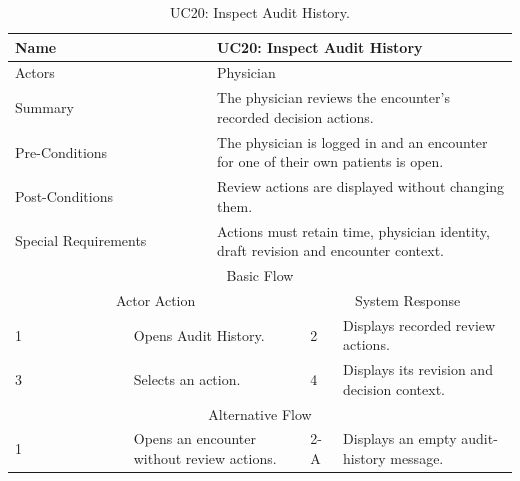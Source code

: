 \begin{table}[htbp]
\centering
\small
\caption{UC20: Inspect Audit History.}
\label{tab:kashaf:uc20}
\begin{tabular}{|p{}|p{}|p{}|p{}|p{}|}
\hline
\multicolumn{2}{|p{\dimexpr0.225\textwidth+2\tabcolsep+\arrayrulewidth\relax}|}{Name} & \multicolumn{3}{p{\dimexpr0.575\textwidth+4\tabcolsep+2\arrayrulewidth\relax}|}{UC20: Inspect Audit History} \\ \hline
\multicolumn{2}{|p{\dimexpr0.225\textwidth+2\tabcolsep+\arrayrulewidth\relax}|}{Actors} & \multicolumn{3}{p{\dimexpr0.575\textwidth+4\tabcolsep+2\arrayrulewidth\relax}|}{Physician} \\ \hline
\multicolumn{2}{|p{\dimexpr0.225\textwidth+2\tabcolsep+\arrayrulewidth\relax}|}{Summary} & \multicolumn{3}{p{\dimexpr0.575\textwidth+4\tabcolsep+2\arrayrulewidth\relax}|}{The physician reviews the encounter's recorded decision actions.} \\ \hline
\multicolumn{2}{|p{\dimexpr0.225\textwidth+2\tabcolsep+\arrayrulewidth\relax}|}{Pre-Conditions} & \multicolumn{3}{p{\dimexpr0.575\textwidth+4\tabcolsep+2\arrayrulewidth\relax}|}{The physician is logged in and an encounter for one of their own patients is open.} \\ \hline
\multicolumn{2}{|p{\dimexpr0.225\textwidth+2\tabcolsep+\arrayrulewidth\relax}|}{Post-Conditions} & \multicolumn{3}{p{\dimexpr0.575\textwidth+4\tabcolsep+2\arrayrulewidth\relax}|}{Review actions are displayed without changing them.} \\ \hline
\multicolumn{2}{|p{\dimexpr0.225\textwidth+2\tabcolsep+\arrayrulewidth\relax}|}{Special Requirements} & \multicolumn{3}{p{\dimexpr0.575\textwidth+4\tabcolsep+2\arrayrulewidth\relax}|}{Actions must retain time, physician identity, draft revision and encounter context.} \\ \hline
\multicolumn{5}{|c|}{Basic Flow} \\ \hline
\multicolumn{3}{|c|}{Actor Action} & \multicolumn{2}{c|}{System Response} \\ \hline
1 & \multicolumn{2}{p{\dimexpr0.37\textwidth+2\tabcolsep+\arrayrulewidth\relax}|}{Opens Audit History.} & 2 & Displays recorded review actions. \\ \hline
3 & \multicolumn{2}{p{\dimexpr0.37\textwidth+2\tabcolsep+\arrayrulewidth\relax}|}{Selects an action.} & 4 & Displays its revision and decision context. \\ \hline
\multicolumn{5}{|c|}{Alternative Flow} \\ \hline
1 & \multicolumn{2}{p{\dimexpr0.37\textwidth+2\tabcolsep+\arrayrulewidth\relax}|}{Opens an encounter without review actions.} & 2-A & Displays an empty audit-history message. \\ \hline
\end{tabular}
\end{table}

